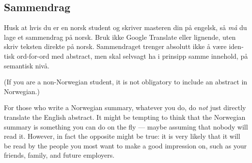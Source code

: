 \begin{otherlanguage}{norsk}

\section*{Sammendrag}

Husk at hvis du er en norsk student og skriver masteren din på engelsk, så \textit{må\/} du lage et sammendrag på norsk.
Bruk ikke Google Translate eller lignende, uten skriv teksten direkte på norsk.
Sammendraget trenger absolutt ikke å være identisk ord-for-ord med abstract, men skal selvsagt ha i prinsipp samme innehold, på semantisk nivå.

\end{otherlanguage}

(If you are a non-Norwegian student, it is not obligatory to include an abstract in Norwegian.)

For those who write a Norwegian summary, whatever you do, do \textit{not\/} just directly translate the English abstract.
It might be tempting to think that the Norwegian summary is something you can do on the fly --- maybe assuming that nobody will read it. 
However, in fact the opposite might be true: it is very likely that it will be read by the people you most want to make a good impression on,
such as your friends, family, and future employers. 

